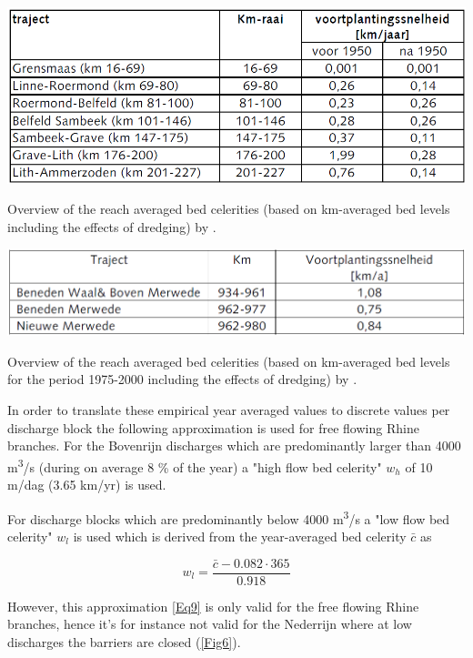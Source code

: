 \begin{table}
\includegraphics[width=\columnwidth]{figures/Tab3.png}
\caption{Overview of the reach averaged bed celerities (based on km-averaged bed levels including the effects of dredging) by \citet{Waterdienst2008}.}
\label{Tab3Again}
\end{table}

\begin{table}
\includegraphics[width=\columnwidth]{figures/Tab4.png}
\caption{Overview of the reach averaged bed celerities (based on km-averaged bed levels for the period 1975-2000 including the effects of dredging) by \citet{RIZA2007}.}
\label{Tab4}
\end{table}

In order to translate these empirical year averaged values to discrete values per discharge block the following approximation is used for free flowing Rhine branches.
For the Bovenrijn discharges which are predominantly larger than 4000 m\textsuperscript{3}/s (during on average 8 \% of the year) a "high flow bed celerity" $w_h$ of 10 m/dag (3.65 km/yr) is used.

For discharge blocks which are predominantly below 4000 m\textsuperscript{3}/s a "low flow bed celerity" $w_l$ is used which is derived from the year-averaged bed celerity $\bar{c}$ as

\begin{equation}
w_l = \frac{\bar{c} - 0.082 \cdot 365}{0.918}
\label{Eq9}
\end{equation}

However, this approximation \autoref{Eq9} is only valid for the free flowing Rhine branches, hence it's for instance not valid for the Nederrijn where at low discharges the barriers are closed (\autoref{Fig6}).

